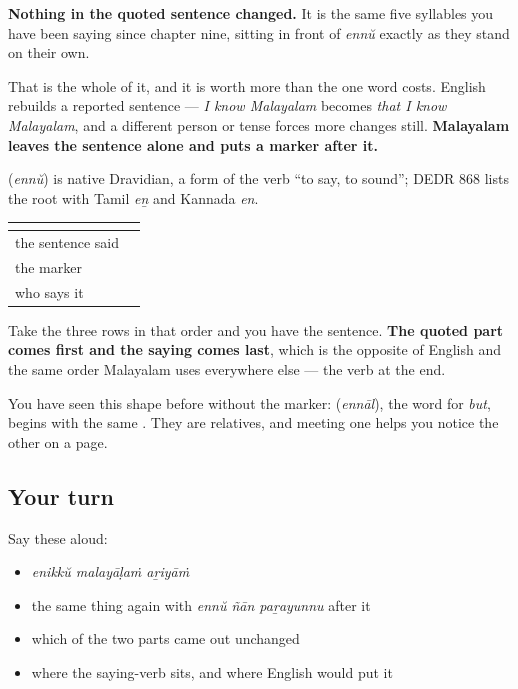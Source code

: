 \textbf{Nothing in the quoted sentence changed.} It is the same five syllables you have been saying since chapter nine, sitting in front of \emph{ennŭ} exactly as they stand on their own.

That is the whole of it, and it is worth more than the one word costs. English rebuilds a reported sentence — \emph{I know Malayalam} becomes \emph{that I know Malayalam}, and a different person or tense forces more changes still. \textbf{Malayalam leaves the sentence alone and puts a marker after it.}

\begin{cousinweb}
\textbf{} (\emph{ennŭ}) is native Dravidian, a form of the verb \textquotedblleft{}to say, to sound\textquotedblright{}; DEDR 868 lists the root with Tamil \emph{eṉ} and Kannada \emph{en}.
\end{cousinweb}

\begin{grammarlens}[title={Grammar Lens: where it sits}]
\noindent
\begin{tabularx}{\linewidth}{@{}>{\raggedright\arraybackslash}X>{\raggedright\arraybackslash}X@{}}
\toprule
\textbf{} & \textbf{} \\
\midrule
the sentence said & \textbf{\ml{എനിക്ക്} \ml{മലയാളം} \ml{അറിയാം}} \\
the marker & \textbf{\ml{എന്ന്}} \\
who says it & \textbf{\ml{ഞാൻ} \ml{പറയുന്നു}} \\
\bottomrule
\end{tabularx}

Take the three rows in that order and you have the sentence. \textbf{The quoted part comes first and the saying comes last}, which is the opposite of English and the same order Malayalam uses everywhere else — the verb at the end.

You have seen this shape before without the marker: \textbf{} (\emph{ennāl}), the word for \emph{but}, begins with the same \textbf{}. They are relatives, and meeting one helps you notice the other on a page.
\end{grammarlens}

\subsection*{Your turn}
Say these aloud:

\begin{itemize}
\raggedright
  \item \emph{enikkŭ malayāḷaṁ aṟiyāṁ}
  \item the same thing again with \emph{ennŭ ñān paṟayunnu} after it
  \item which of the two parts came out unchanged
  \item where the saying-verb sits, and where English would put it
\end{itemize}

